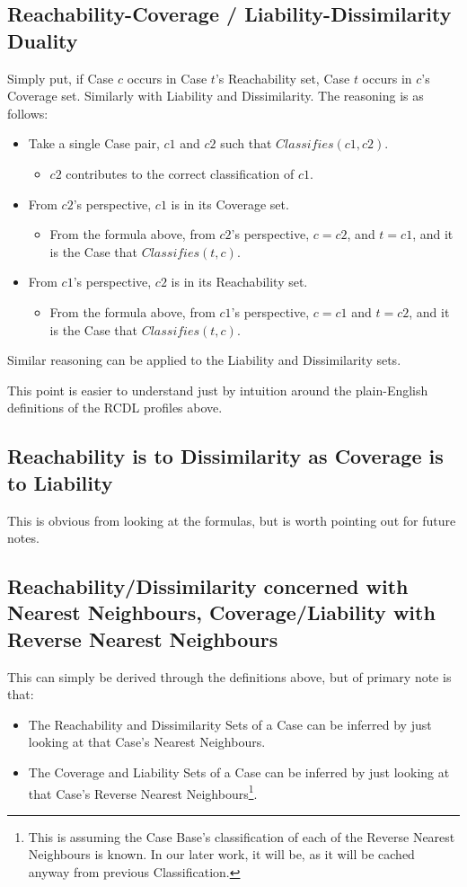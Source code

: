 \documentclass[a4paper,11pt]{report}
\begin{document}
\subsection{Reachability-Coverage / Liability-Dissimilarity Duality}
Simply put, if Case $c$ occurs in Case $t$'s Reachability set, Case $t$ occurs in $c$'s Coverage set. Similarly with Liability and Dissimilarity.
The reasoning is as follows:
\begin{itemize}
	\item Take a single Case pair, $c1$ and $c2$ such that $Classifies(c1, c2)$.
	\begin{itemize}
		\item $c2$ contributes to the correct classification of $c1$.
	\end{itemize}
	\item From $c2$'s perspective, $c1$ is in its Coverage set.
	\begin{itemize}
		\item From the formula above, from $c2$'s perspective, $c=c2$, and $t=c1$, and it is the Case that $Classifies(t, c)$.
	\end{itemize}
	\item From $c1$'s perspective, $c2$ is in its Reachability set.
	\begin{itemize}
		\item From the formula above, from $c1$'s perspective, $c=c1$ and $t=c2$, and it is the Case that $Classifies(t, c)$.
	\end{itemize}
\end{itemize}

Similar reasoning can be applied to the Liability and Dissimilarity sets.

This point is easier to understand just by intuition around the plain-English definitions of the RCDL profiles above.

\subsection{Reachability is to Dissimilarity as Coverage is to Liability}
This is obvious from looking at the formulas, but is worth pointing out for future notes.

\subsection{Reachability/Dissimilarity concerned with Nearest Neighbours, Coverage/Liability with Reverse Nearest Neighbours \label{sec:RdWithNnClWithRnn}}
This can simply be derived through the definitions above, but of primary note is that:
\begin{itemize}
	\item The Reachability and Dissimilarity Sets of a Case can be inferred by just looking at that Case's Nearest Neighbours.
	\item The Coverage and Liability Sets of a Case can be inferred by just looking at that Case's Reverse Nearest Neighbours\footnote{This is assuming the Case Base's classification of each of the Reverse Nearest Neighbours is known. In our later work, it will be, as it will be cached anyway from previous Classification.}.
\end{itemize}
\end{document}
